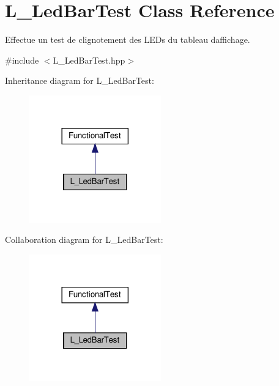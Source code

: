 \hypertarget{classL__LedBarTest}{}\section{L\+\_\+\+Led\+Bar\+Test Class Reference}
\label{classL__LedBarTest}


Effectue un test de clignotement des L\+E\+Ds du tableau d\textquotesingle{}affichage.  




{\ttfamily \#include $<$L\+\_\+\+Led\+Bar\+Test.\+hpp$>$}



Inheritance diagram for L\+\_\+\+Led\+Bar\+Test\+:
\nopagebreak
\begin{figure}[H]
\begin{center}
\leavevmode
\includegraphics[width=161pt]{classL__LedBarTest__inherit__graph}
\end{center}
\end{figure}


Collaboration diagram for L\+\_\+\+Led\+Bar\+Test\+:
\nopagebreak
\begin{figure}[H]
\begin{center}
\leavevmode
\includegraphics[width=161pt]{classL__LedBarTest__coll__graph}
\end{center}
\end{figure}
